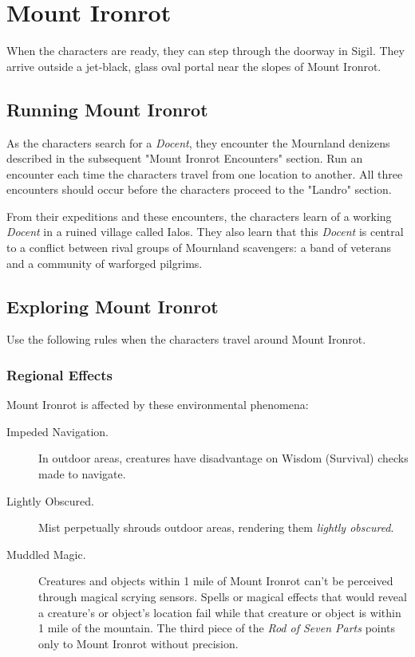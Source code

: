 \documentclass[10pt,a4paper,twoside,bg=print,twocolumn,openany,nodeprecatedcode]{dndbook}
\begin{document}
\section{Mount Ironrot}
When the characters are ready, they can step through the doorway in Sigil. They arrive outside a jet-black, glass oval portal near the slopes of Mount Ironrot.

\subsection{Running Mount Ironrot}
As the characters search for a \textit{Docent}, they encounter the Mournland denizens described in the subsequent "Mount Ironrot Encounters" section. Run an encounter each time the characters travel from one location to another. All three encounters should occur before the characters proceed to the "Landro" section.

From their expeditions and these encounters, the characters learn of a working \textit{Docent} in a ruined village called Ialos. They also learn that this \textit{Docent} is central to a conflict between rival groups of Mournland scavengers: a band of veterans and a community of warforged pilgrims.

\subsection{Exploring Mount Ironrot}
Use the following rules when the characters travel around Mount Ironrot.

\subsubsection{Regional Effects}
Mount Ironrot is affected by these environmental phenomena:


\begin{description}
\item[Impeded Navigation.]
In outdoor areas, creatures have disadvantage on Wisdom (Survival) checks made to navigate.
\item[Lightly Obscured.]
Mist perpetually shrouds outdoor areas, rendering them \textit{lightly obscured}.
\item[Muddled Magic.]
Creatures and objects within 1 mile of Mount Ironrot can't be perceived through magical scrying sensors. Spells or magical effects that would reveal a creature's or object's location fail while that creature or object is within 1 mile of the mountain. The third piece of the \textit{Rod of Seven Parts} points only to Mount Ironrot without precision.
\end{description}
\end{document}
